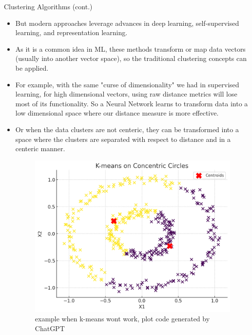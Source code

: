 \documentclass[serif, aspectratio=169]{beamer}
\begin{document}
\begin{frame}{Clustering Algorithms (cont.)}
\begin{itemize}
    \item But modern approaches leverage advances in deep learning, self-supervised learning, and representation learning.
    \item As it is a common idea in ML, these methods transform or map data vectors (usually into another vector space), so the traditional clustering concepts can be applied.
    \item For example, with the same "curse of dimensionality" we had in supervised learning, for high dimensional vectors, using raw distance metrics will lose most of its functionality. So a Neural Network learns to transform data into a low dimensional space where our distance measure is more effective.
    \item Or when the data clusters are not centeric, they can be transformed into a space where the clusters are separated with respect to distance and in a centeric manner.

    \begin{figure}
        \centering
        \includegraphics[scale=0.45]{pic/figs/kmeans_anti.png}
        \caption{example when k-means wont work, plot code generated by ChatGPT}
    \end{figure}
    
\end{itemize}
\end{frame}
\end{document}

